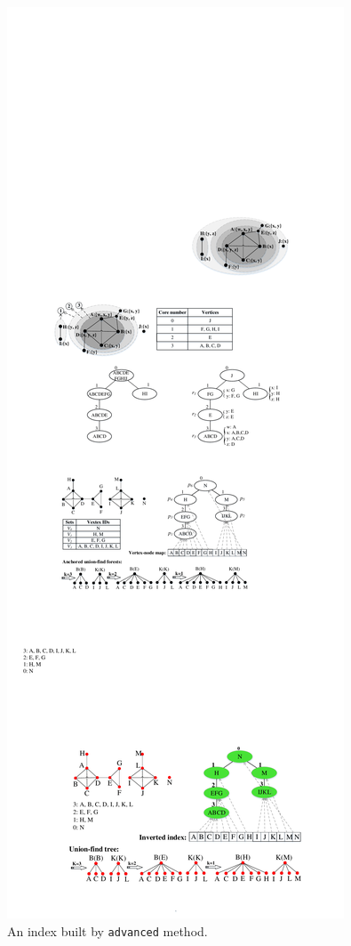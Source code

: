 \begin{figure}
	\small
	\centering
	\includegraphics[width=0.85\linewidth]{figures/advancedIndex}
	\caption{An index built by {\tt advanced} method.}
	\label{fig:advancedIndex}
\end{figure} 